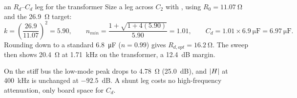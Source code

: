 \begin{examplebox}[label=ex:rd-cd]{an $R_d$--$C_d$ leg for the transformer}
	Size a leg across $C_2$ with , using
	$R_0 = \qty{11.07}{\ohm}$ and the \qty{26.9}{\ohm} target:
	\[
		k = \left(\frac{26.9}{11.07}\right)^2 = 5.90, \qquad
		n_{min} = \frac{1 + \sqrt{1 + 4(5.90)}}{5.90} = 1.01, \qquad
		C_d = 1.01 \times \qty{6.9}{\micro\farad} = \qty{6.97}{\micro\farad}.
	\]
	Rounding down to a standard \qty{6.8}{\micro\farad} ($n = 0.99$) gives
	$R_{d,opt} = \qty{16.2}{\ohm}$. The sweep then shows \qty{20.4}{\ohm} at
	\qty{1.71}{\kHz} on the transformer, a 12.4~dB margin.

	On the stiff bus the low-mode peak drops to \qty{4.78}{\ohm} (25.0~dB),
	and $\lvert H\rvert$ at \qty{400}{\kHz} is unchanged at $-92.5$~dB. A shunt leg costs
	no high-frequency attenuation, only board space for $C_d$.
\end{examplebox}
